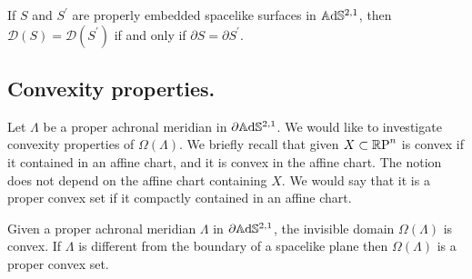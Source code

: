 \begin{corollary}
    If $S$ and $S^{\prime}$ are properly embedded spacelike surfaces in $\mathbb{A}\mathrm{d}\mathbb{S}^{2,1}$, then $\mathcal{D}(S)=\mathcal{D}(S^{\prime})$ if and only if $\partial S=\partial S^{\prime}$. 
\end{corollary}

\subsection{Convexity properties.}

Let $\Lambda$ be a proper achronal meridian in $\partial\mathbb{A}\mathrm{d}\mathbb{S}^{2,1}$. We would like to investigate convexity properties of $\Omega(\Lambda)$. We briefly recall that given $X \subset \mathbb{R}\text{P}^n$ is convex if it contained in an affine chart, and it is convex in the affine chart. The notion does not depend on the affine chart containing $X$. We would say that it is a proper convex set if it compactly contained in an affine chart. 

\begin{proposition}\label{461}
    Given a proper achronal meridian $\Lambda$ in $\partial\mathbb{A}\mathrm{d}\mathbb{S}^{2,1}$, the invisible domain $\Omega(\Lambda)$ is convex. If $\Lambda$ is different from the boundary of a spacelike plane then $\Omega(\Lambda)$ is a proper convex set.
\end{proposition}

